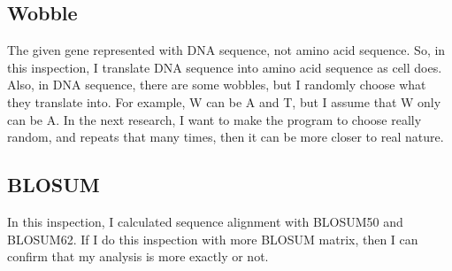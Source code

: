 \documentclass[aps,10pt,a4paper]{article}
\begin{document}
		\subsection{Wobble}
			The given gene represented with DNA sequence, not amino acid sequence. So, in this inspection, I translate DNA sequence into amino acid sequence as cell does. Also, in DNA sequence, there are some wobbles, but I randomly choose what they translate into. For example, W can be A and T, but I assume that W only can be A. In the next research, I want to make the program to choose really random, and repeats that many times, then it can be more closer to real nature.
		
		\subsection{BLOSUM}
			 In this inspection, I calculated sequence alignment with BLOSUM50 and BLOSUM62. If I do this inspection with more BLOSUM matrix, then I can confirm that my analysis is more exactly or not. 
	
	
	
\end{document}
